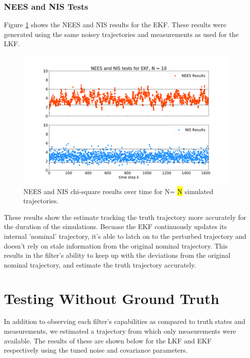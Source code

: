\documentclass[11pt, a4paper]{article}
\begin{document}
\subsubsection{NEES and NIS Tests}
Figure \ref{fig:neesnis_ekf} shows the NEES and NIS results for the EKF.
These results were generated using the same noisey trajectories and measurements as used for the LKF. 

\begin{figure}[H]
	\centering
	\includegraphics[width=\textwidth]{./Figures/NEESNIS_ekf_N10Q1.0E-09.png}
	\caption{NEES and NIS chi-square results over time for N= \hl{N} simulated trajectories.}
	\label{fig:neesnis_ekf}
\end{figure}

These results show the estimate tracking the truth trajectory more accurately for the duration of the simulations. 
Becuase the EKF continuously updates its internal 'nominal' trajectory, it's able to latch on to the perturbed trajectory and doesn't rely on stale information from the original nominal trajectory. 
This results in the filter's ability to keep up with the deviations from the original nominal trajectory, and estimate the truth trajectory accurately.


\section{Testing Without Ground Truth}
In addition to observing each filter's capabilities as compared to truth states and measurements, we estimated a trajectory from which only measurements were available. 
The results of these  are shown below for the LKF and EKF respectively using the tuned noise and covariance parameters. 
\end{document}
